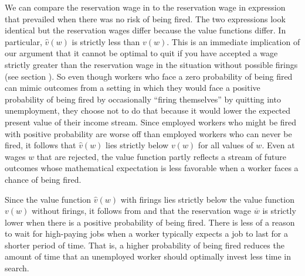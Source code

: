 We can compare the reservation wage in  to the
reservation wage in expression  that prevailed  when there was no risk of
being fired. The two expressions look identical but the reservation
wages differ because the value functions differ.
In particular,  $\hat v(w)$ is  strictly
less than $v(w)$. This is an immediate implication of our argument that it
cannot be optimal to quit if you have accepted a wage strictly
greater than the reservation wage in the situation without possible  firings
(see section ). So even though workers who face  a zero probability of being fired can mimic outcomes from 
a setting in which they would face a positive probability of being fired  by
occasionally ``firing themselves'' by  quitting into unemployment, they choose
not to do that because it  would lower the expected present value of their income stream. Since
employed workers who might be fired with positive probability are worse off than
employed workers who can never be fired,  it follows that $\hat v(w)$
lies strictly below $v(w)$ for all values of $w$. Even at wages $w$
that are rejected, the value function partly reflects a stream of future outcomes whose mathematical 
expectation is less favorable when a worker faces a chance of
being fired.

Since the value function $\hat v(w)$  with firings lies
strictly below the value function $v(w)$ without firings,
it follows from  and  that the reservation
wage $\overline w$ is strictly lower  when there is a positive probability of being fired.
There is less of a reason to wait for high-paying jobs when a worker typically expects a job
 to last for a shorter period of time.
That is, a higher probability of being fired reduces the amount of time  that an unemployed worker should  optimally invest less time in search.





